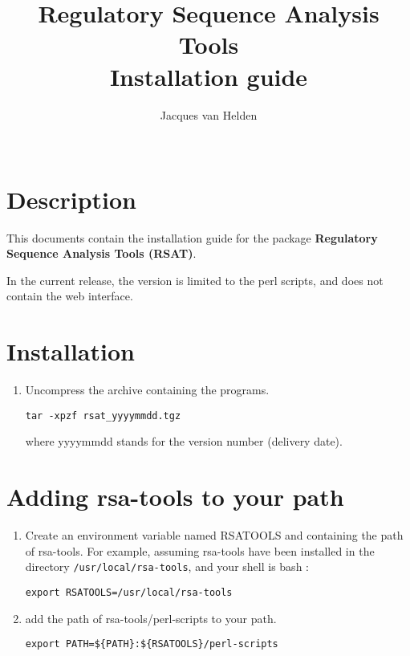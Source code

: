 \documentclass{article}
\begin{document}
\title{Regulatory Sequence Analysis Tools \\
Installation guide}

\author{
	Jacques van Helden \\
	 \\
	\scmb 
}



\maketitle


\section{Description}

This documents contain the installation guide for the package
\textbf{Regulatory Sequence Analysis Tools (RSAT)}.

In the current release, the version is limited to the perl scripts,
and does not contain the web interface.


\section{Installation}

\begin{enumerate}

\item Uncompress the archive containing the programs. 
\begin{verbatim}
tar -xpzf rsat_yyyymmdd.tgz
\end{verbatim}

where yyyymmdd stands for the version number (delivery date).

\end{enumerate}

\section{Adding rsa-tools to your path}

\begin{enumerate}

\item Create an environment variable named RSATOOLS and containing the
path of rsa-tools. For example, assuming rsa-tools have been installed
in the directory \texttt{/usr/local/rsa-tools}, and your shell is bash
:

\begin{verbatim}
export RSATOOLS=/usr/local/rsa-tools
\end{verbatim}

\item add the path of rsa-tools/perl-scripts to your path.
\begin{verbatim}
export PATH=${PATH}:${RSATOOLS}/perl-scripts
\end{verbatim}

\end{enumerate}
\end{document}
